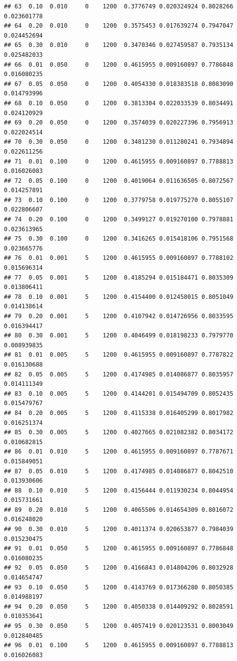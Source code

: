\documentclass[
]{article}
\begin{document}
\begin{verbatim}
## 63  0.10  0.010     0    1200  0.3776749 0.020324924 0.8028266 0.023601778
## 64  0.20  0.010     0    1200  0.3575453 0.017639274 0.7947047 0.024452694
## 65  0.30  0.010     0    1200  0.3470346 0.027459587 0.7935134 0.025482033
## 66  0.01  0.050     0    1200  0.4615955 0.009160897 0.7786848 0.016080235
## 67  0.05  0.050     0    1200  0.4054330 0.018383518 0.8083090 0.014793996
## 68  0.10  0.050     0    1200  0.3813304 0.022033539 0.8034491 0.024120929
## 69  0.20  0.050     0    1200  0.3574039 0.020227396 0.7956913 0.022024514
## 70  0.30  0.050     0    1200  0.3481230 0.011280241 0.7934894 0.022611256
## 71  0.01  0.100     0    1200  0.4615955 0.009160897 0.7788813 0.016026083
## 72  0.05  0.100     0    1200  0.4019064 0.011636505 0.8072567 0.014257891
## 73  0.10  0.100     0    1200  0.3779758 0.019775270 0.8055107 0.022806607
## 74  0.20  0.100     0    1200  0.3499127 0.019270100 0.7978881 0.023613965
## 75  0.30  0.100     0    1200  0.3416265 0.015418106 0.7951568 0.023665776
## 76  0.01  0.001     5    1200  0.4615955 0.009160897 0.7788102 0.015696314
## 77  0.05  0.001     5    1200  0.4185294 0.015184471 0.8035309 0.013806411
## 78  0.10  0.001     5    1200  0.4154400 0.012458015 0.8051049 0.014138614
## 79  0.20  0.001     5    1200  0.4107942 0.014726956 0.8033595 0.016394417
## 80  0.30  0.001     5    1200  0.4046499 0.018198233 0.7979770 0.008939835
## 81  0.01  0.005     5    1200  0.4615955 0.009160897 0.7787822 0.016130688
## 82  0.05  0.005     5    1200  0.4174985 0.014086877 0.8035957 0.014111349
## 83  0.10  0.005     5    1200  0.4144201 0.015494709 0.8052435 0.015479767
## 84  0.20  0.005     5    1200  0.4115338 0.016405299 0.8017982 0.016251374
## 85  0.30  0.005     5    1200  0.4027665 0.021082382 0.8034172 0.010682815
## 86  0.01  0.010     5    1200  0.4615955 0.009160897 0.7787671 0.015849051
## 87  0.05  0.010     5    1200  0.4174985 0.014086877 0.8042510 0.013930606
## 88  0.10  0.010     5    1200  0.4156444 0.011930234 0.8044954 0.015731661
## 89  0.20  0.010     5    1200  0.4065506 0.014654309 0.8016072 0.016248020
## 90  0.30  0.010     5    1200  0.4011374 0.020653877 0.7984039 0.015230475
## 91  0.01  0.050     5    1200  0.4615955 0.009160897 0.7786848 0.016080235
## 92  0.05  0.050     5    1200  0.4166843 0.014804206 0.8032928 0.014654747
## 93  0.10  0.050     5    1200  0.4143769 0.017366280 0.8050385 0.014988197
## 94  0.20  0.050     5    1200  0.4050338 0.014409292 0.8028591 0.010353641
## 95  0.30  0.050     5    1200  0.4057419 0.020123531 0.8003049 0.012840485
## 96  0.01  0.100     5    1200  0.4615955 0.009160897 0.7788813 0.016026083

\end{verbatim}
\end{document}
